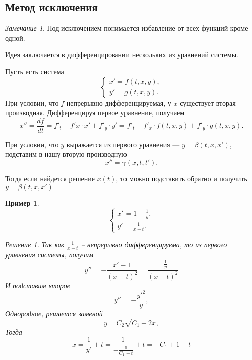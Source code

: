 \documentclass[a5paper, 11pt]{article}
\theoremstyle{definition}
\theoremstyle{plain}
\newtheorem{Ex}{Пример}
\theoremstyle{remark}
\newtheorem*{Note}{Замечание}
\newtheorem*{Solution}{Решение}
\begin{document}
	\subsection{Метод исключения}
	\begin{Note}
		Под исключением понимается избавление от всех функций кроме одной. 
		
		Идея заключается в дифференцировании нескольких из уравнений системы.
		
		Пусть есть система
		\[
		\begin{cases}
			x' = f(t,x,y),\\
			y' = g(t,x,y).
		\end{cases}
		\]
		При условии, что $f$ непрерывно дифференцируемая, у $x$ существует вторая производная.
		Дифференцируя первое уравнение, получаем
		\[
		x'' = \frac{df}{dt} = f'_t + f'x \cdot x' + f'_y \cdot y' = f'_t + f'_x \cdot f(t,x,y) + f'_y \cdot g(t,x,y).
		\]
		
		При условии, что $y$ выражается из первого уравнения --- $y = \beta(t,x,x')$, подставим в нашу вторую производную
		\[
		x'' = \gamma(x,t,t').
		\]
		
		Тогда если найдется решение $x(t)$, то можно подставить обратно и получить $y = \beta(t,x,x')$
	\end{Note}	

	\begin{Ex}
		\[
		\begin{cases}
			x' = 1-\frac1y,\\
			y' = \frac1{x-t}.
		\end{cases}
		\]
		\begin{Solution}
			Так как $\frac{1}{x-t}$ -- непрерывно дифференцируема, то из первого уравнения системы, получим 
			\[
			y'' = -\frac{x'-1}{(x-t)^2}  = \frac{-\frac1{y}}{(x-t)^2} 
			\]
			И подставим  второе
			\[
			y'' = -\frac{y'^2}{y},
			\]
			Однородное, решается заменой 
			\[
			y = C_2 \sqrt{C_1+2x},
			\]
			Тогда \[
			x = \frac{1}{y'} + t = \frac{1}{-\frac{1}{C_1+t}} + t = -{C_1+1} + t
			\]
		\end{Solution}
	\end{Ex}
\end{document}

